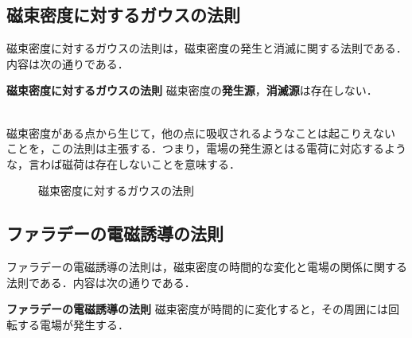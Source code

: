         \subsection{磁束密度に対するガウスの法則}
        磁束密度に対するガウスの法則は，磁束密度の発生と消滅に関する法則である．
        内容は次の通りである．
            \\
            \begin{itembox}[l]{\textbf{磁束密度に対するガウスの法則}}
                磁束密度の\textbf{発生源}，\textbf{消滅源}は存在しない．
            \end{itembox}
            \\

        磁束密度がある点から生じて，他の点に吸収されるようなことは起こりえない
        ことを，この法則は主張する．つまり，電場の発生源とはる電荷に対応するよう
        な，言わば磁荷は存在しないことを意味する．
                \begin{figure}[hbt]
                    \begin{center}
                        \caption{磁束密度に対するガウスの法則}
                        \label{fig:GaussLowBImage_01}
                    \end{center}
                \end{figure}

        \subsection{ファラデーの電磁誘導の法則}
        ファラデーの電磁誘導の法則は，磁束密度の時間的な変化と電場の関係に関する
        法則である．内容は次の通りである．
           \\
           \begin{itembox}[l]{\textbf{ファラデーの電磁誘導の法則}}
               磁束密度が時間的に変化すると，その周囲には回転する電場が発生する．
           \end{itembox}
           \\

